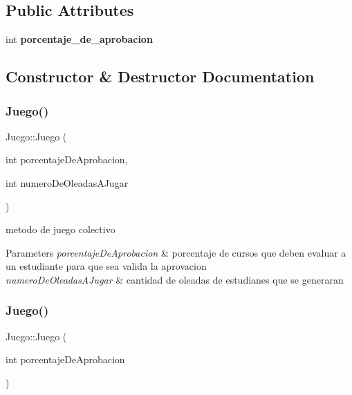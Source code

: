 \subsection*{Public Attributes}
\begin{DoxyCompactItemize}
\item 
\mbox{\label{classJuego_aae631a3a7ffbc5cfe3fefcb0b0f13dd6}} 
int {\bfseries porcentaje\+\_\+de\+\_\+aprobacion}
\end{DoxyCompactItemize}


\subsection{Constructor \& Destructor Documentation}
\mbox{\label{classJuego_a81c4a707b89b6fc9daf1657bf49ea851}} 
\subsubsection{\texorpdfstring{Juego()}{Juego()}\hspace{0.1cm}{\footnotesize\ttfamily [1/2]}}
{\footnotesize\ttfamily Juego\+::\+Juego (\begin{DoxyParamCaption}\item[{int}]{porcentaje\+De\+Aprobacion,  }\item[{int}]{numero\+De\+Oleadas\+A\+Jugar }\end{DoxyParamCaption})}



metodo de juego colectivo 


\begin{DoxyParams}{Parameters}
{\em porcentaje\+De\+Aprobacion} & porcentaje de cursos que deben evaluar a un estudiante para que sea valida la aprovacion \\
\hline
{\em numero\+De\+Oleadas\+A\+Jugar} & cantidad de oleadas de estudianes que se generaran \\
\hline
\end{DoxyParams}
\mbox{\label{classJuego_ad55bfa8c90aff47becec97660f3b9d3d}} 
\subsubsection{\texorpdfstring{Juego()}{Juego()}\hspace{0.1cm}{\footnotesize\ttfamily [2/2]}}
{\footnotesize\ttfamily Juego\+::\+Juego (\begin{DoxyParamCaption}\item[{int}]{porcentaje\+De\+Aprobacion }\end{DoxyParamCaption})}



